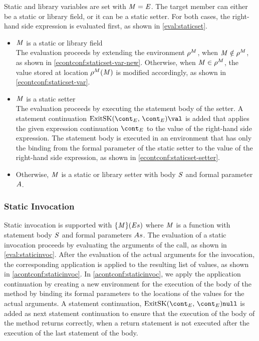 \documentclass[a4paper,oneside]{article}
\begin{document}
Static and library variables are set with $\mathit{M}=\mathit{E}$.
The target member can either be a static or library field, or it can be a static setter. For both cases, the right-hand side expression is evaluated first, as shown in \eqref{eval:staticset}.

\begin{itemize}
    \item $\mathit{M}$ is a static or library field\\
        The evaluation proceeds by extending the environment $\rho^{M}$, when $\mathit{M} \notin \rho^{M}$, as shown in \eqref{econtconf:staticset-var-new}.
        Otherwise, when $\mathit{M} \in \rho^{M}$, the value stored at location $\rho^{M}(\mathit{M})$ is modified accordingly, as shown in \eqref{econtconf:staticset-var}.

    \item $\mathit{M}$ is a static setter\\
        The evaluation proceeds by executing the statement body of the setter. A statement continuation $\ExitSK{\econt}{\val}$ is added that applies the given expression continuation $\econt$ to the value of the right-hand side expression.
        The statement body is executed in an environment that has only the binding from the formal parameter of the static setter to the value of the right-hand side expression, as shown in \eqref{econtconf:staticset-setter}.

    \item Otherwise, $\mathit{M}$ is a static or library setter with body $\mathit{S}$ and formal parameter $A$.

\end{itemize}


\subsubsection{Static Invocation}
\label{subsubsec:static-invoc}

Static invocation is supported with $\{\mathit{M}\}(\mathit{E}{s})$ where $\mathit{M}$ is a function with statement body $\mathit{S}$ and formal parameters $As$.
The evaluation of a static invocation proceeds by evaluating the arguments of the call, as shown in \eqref{eval:staticinvoc}.
After the evaluation of the actual arguments for the invocation, the corresponding application is applied to the resulting list of values, as shown in \eqref{acontconf:staticinvoc}.
In \eqref{acontconf:staticinvoc}, we apply the application continuation by creating a new environment for the execution of the body of the method by binding its formal parameters to the locations of the values for the actual arguments.
A statement continuation, $\ExitSK{\econt}{\tt{null}}$ is added as next statement continuation to ensure that the execution of the body of the method returns correctly, when a return statement is not executed after the execution of the last statement of the body.
\end{document}
